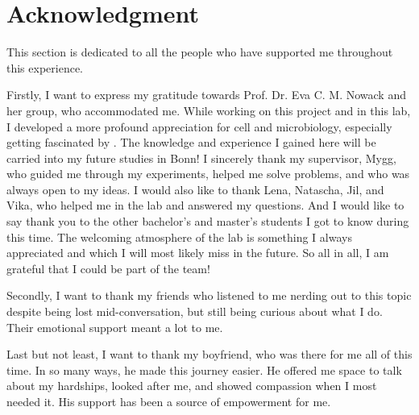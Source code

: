 \chapter{Acknowledgment}
This section is dedicated to all the people who have supported me throughout this experience.
\par Firstly, I want to express my gratitude towards Prof. Dr. Eva C. M. Nowack and her group, who accommodated me. While working on this project and in this lab, I developed a more profound appreciation for cell and microbiology, especially getting fascinated by . The knowledge and experience I gained here will be carried into my future studies in Bonn! I sincerely thank my supervisor, Mygg, who guided me through my experiments, helped me solve problems, and who was always open to my ideas. I would also like to thank Lena, Natascha, Jil, and Vika, who helped me in the lab and answered my questions. And I would like to say thank you to the other bachelor's and master's students I got to know during this time. The welcoming atmosphere of the lab is something I always appreciated and which I will most likely miss in the future. So all in all, I am grateful that I could be part of the team!
\par Secondly, I want to thank my friends who listened to me nerding out to this topic despite being lost mid-conversation, but still being curious about what I do. Their emotional support meant a lot to me. 
\par Last but not least, I want to thank my boyfriend, who was there for me all of this time. In so many ways, he made this journey easier. He offered me space to talk about my hardships, looked after me, and showed compassion when I most needed it. His support has been a source of empowerment for me.
